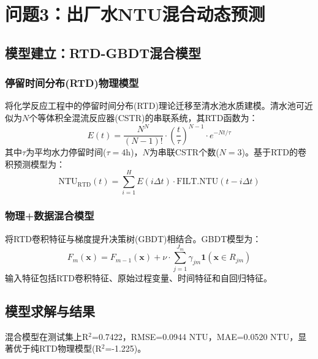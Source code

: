 \documentclass[12pt,a4paper]{ctexart}
\begin{document}
\newpage

\section{问题3：出厂水NTU混合动态预测}

\subsection{模型建立：RTD-GBDT混合模型}

\subsubsection{停留时间分布(RTD)物理模型}

将化学反应工程中的停留时间分布(RTD)理论迁移至清水池水质建模。清水池可近似为$N$个等体积全混流反应器(CSTR)的串联系统，其RTD函数为：
\begin{equation}
E(t) = \frac{N^N}{(N-1)!} \cdot \left(\frac{t}{\tau}\right)^{N-1} \cdot e^{-Nt/\tau}
\label{eq:rtd}
\end{equation}
其中$\tau$为平均水力停留时间($\tau=4$h)，$N$为串联CSTR个数($N=3$)。基于RTD的卷积预测模型为：
\begin{equation}
\text{NTU}_{\text{RTD}}(t) = \sum_{i=1}^{H} E(i\Delta t) \cdot \text{FILT.NTU}(t - i\Delta t)
\label{eq:rtd_conv}
\end{equation}

\subsubsection{物理+数据混合模型}

将RTD卷积特征与梯度提升决策树(GBDT)相结合。GBDT模型为：
\begin{equation}
F_m(\mathbf{x}) = F_{m-1}(\mathbf{x}) + \nu \cdot \sum_{j=1}^{J_m} \gamma_{jm} \mathbf{1}(\mathbf{x} \in R_{jm})
\label{eq:gbdt}
\end{equation}
输入特征包括RTD卷积特征、原始过程变量、时间特征和自回归特征。

\subsection{模型求解与结果}

混合模型在测试集上R$^2$=0.7422，RMSE=0.0944 NTU，MAE=0.0520 NTU，显著优于纯RTD物理模型(R$^2$=-1.225)。
\end{document}
